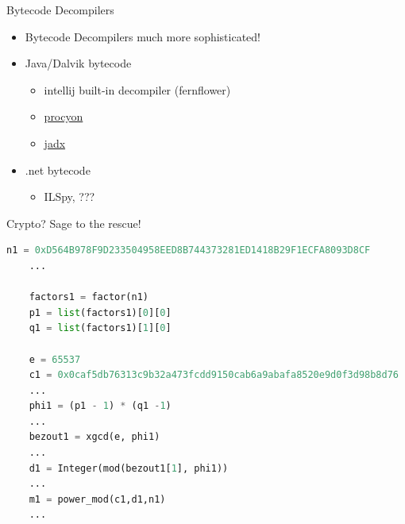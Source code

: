 \begin{frame}[fragile]
  {Bytecode Decompilers}

  \begin{itemize}
    \item Bytecode Decompilers much more sophisticated!
    \item Java/Dalvik bytecode
      \begin{itemize}
        \item intellij built-in decompiler (fernflower)
        \item
          \href{https://bitbucket.org/mstrobel/procyon/}{procyon}
        \item \href{https://github.com/skylot/jadx}{jadx}
      \end{itemize}
    \item .net bytecode
      \begin{itemize}
        \item ILSpy, ???
      \end{itemize}
  \end{itemize}

\end{frame}



\begin{frame}[fragile]
	{Crypto? Sage to the rescue!}

  \begin{lstlisting}[language=python]
	n1 = 0xD564B978F9D233504958EED8B744373281ED1418B29F1ECFA8093D8CF
	...
	
	factors1 = factor(n1)
	p1 = list(factors1)[0][0]
	q1 = list(factors1)[1][0]
	
	e = 65537
	c1 = 0x0caf5db76313c9b32a473fcdd9150cab6a9abafa8520e9d0f3d98b8d76
	...
	phi1 = (p1 - 1) * (q1 -1)
	...
	bezout1 = xgcd(e, phi1)
	...
	d1 = Integer(mod(bezout1[1], phi1))
	...
	m1 = power_mod(c1,d1,n1)
	...
  \end{lstlisting}
\end{frame}


\begin{frame}

\end{frame}



